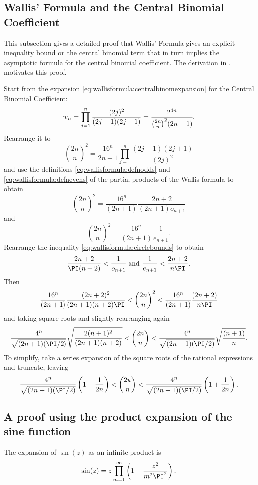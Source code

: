 \documentclass[12pt]{article}
\begin{document}
\subsection*{Wallis' Formula and the Central Binomial Coefficient}

This subsection gives a detailed proof that Wallis' Formula gives an
explicit inequality bound on the central binomial term that in turn
implies the asymptotic formula for the central binomial coefficient. The
derivation in
\cite{hirschhorn15}.%
motivates this proof.

Start from the expansion \eqref{eq:wallisformula:centralbinomexpansion}
for the Central Binomial Coefficient:
\[
    w_n = \prod_{j=1}^{n} \frac{(2j)^2}{(2j-1)(2j+1)} = \frac{ 2^{4n}}{%
    {\binom{2n}{n}}^2(2n+1)}.
\] Rearrange it to
\[
    {\binom{2n}{n}}^2 = \frac{16^n}{2n+1} \prod_{j=1}^{n} \frac{(2j-1)(2j+1)}
    {(2j)^2}
\] and use the definitions \eqref{eq:wallisformula:defnodds} and \eqref{eq:wallisformula:defnevens}
of the partial products of the Wallis formula to obtain
\[
    {\binom{2n}{n}}^2 = \frac{16^n}{(2n+1)} \frac{2n+2}{(2n+1)o_{n+1}}
\] and
\[
    {\binom{2n}{n}}^2 = \frac{16^n}{(2n+1)} \frac{1}{e_{n+1}}.
\] Rearrange the inequality \eqref{eq:wallisformula:circlebounds} to
obtain
\[
    \frac{2n+2}{\PI(n+2)} < \frac{1}{o_{n+1}} \text{ and } \frac{1}{e_{n+1}}
    < \frac{2n+2}{n\PI}.
\] Then
\[
    \frac{16^n}{(2n+1)} \frac{(2n+2)^2}{(2n+1)(n+2)\PI} < {\binom{2n}{n}}^2
    < \frac{16^n}{(2n+1)} \frac{(2n+2)}{n\PI}
\] and taking square roots and slightly rearranging again
\[
    \frac{4^n}{\sqrt{(2n+1)(\PI/2)}} \sqrt{ \frac{2(n+1)^2}{(2n+1)(n+2)}}
    < {\binom{2n}{n}} < \frac{4^n}{\sqrt{(2n+1)(\PI/2)}} \sqrt{\frac{(n+1)}
    {n}}.
\] To simplify, take a series expansion of the square roots of the
rational expressions and truncate, leaving
\[
    \frac{4^n}{\sqrt{(2n+1)(\PI/2)}}\left(1-\frac{1}{2n} \right) < {\binom
    {2n}{n}} < \frac{4^n}{\sqrt{(2n+1)(\PI/2)}} \left(1 + \frac{1}{2n}
    \right).
\]

\subsection*{A proof using the product expansion of the sine function}

\begin{theorem}
    The expansion of \( \sin(z) \) as an infinite product is
    \[
        \sin( z ) = z \prod_{m=1}^{\infty} \left( 1 - \frac{z^2}{m^2 \PI^2}
        \right).
    \]
\end{theorem}
\end{document}

